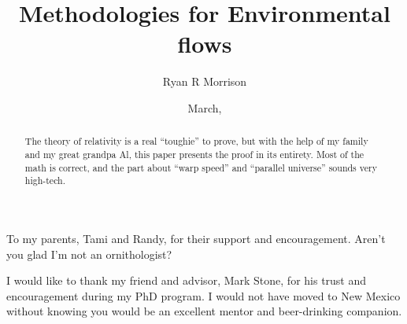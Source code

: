 

\frontmatter

\title{Methodologies for Environmental flows}
\author{Ryan R Morrison}
\date{March, \thisyear} %
\maketitle
\makecopyright

\begin{dedication}
   To my parents, Tami and Randy, for their support and encouragement. Aren't you glad I'm not an ornithologist? \\[3ex]
\end{dedication}

\begin{acknowledgments}
   \vspace{1.1in}
   I would like to thank my friend and advisor, Mark Stone, for his trust and encouragement during my PhD program. I would not have moved to New Mexico without knowing you would be an excellent mentor and beer-drinking companion.


\end{acknowledgments}

\maketitleabstract %

\begin{abstract}
   The theory of relativity is a real ``toughie'' to prove, but with the
   help of my family and my great grandpa Al, this paper presents the
   proof in its entirety.  Most of the math is correct, and the
   part about ``warp speed'' and ``parallel universe'' sounds very high-tech.
\clearpage %
\end{abstract}


